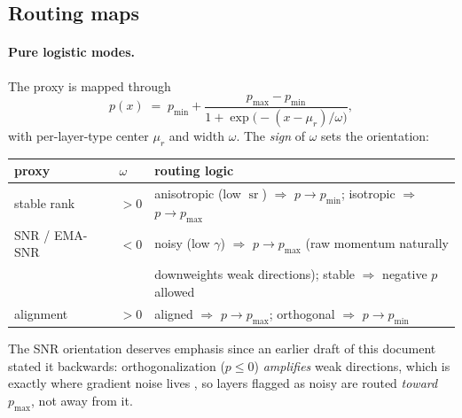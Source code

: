 \documentclass{article}
\DeclareMathOperator*{\srank}{sr}
\begin{document}
\subsection{Routing maps}

\paragraph{Pure logistic modes.} The proxy is mapped through
\begin{equation}
\label{eq:logistic}
p(x) \;=\; p_{\min} + \frac{p_{\max}-p_{\min}}
{1+\exp\!\bigl(-(x-\mu_r)/\omega\bigr)},
\end{equation}
with per-layer-type center $\mu_r$ and width $\omega$. The \emph{sign} of
$\omega$ sets the orientation:
\begin{center}
\begin{tabular}{lll}
\toprule
proxy & $\omega$ & routing logic \\
\midrule
stable rank & $>0$ & anisotropic (low $\srank$) $\Rightarrow$ $p \to p_{\min}$;
isotropic $\Rightarrow$ $p \to p_{\max}$\\
SNR / EMA-SNR & $<0$ & noisy (low $\gamma$) $\Rightarrow$ $p \to p_{\max}$
(raw momentum naturally\\
& & downweights weak directions); stable $\Rightarrow$ negative $p$ allowed\\
alignment & $>0$ & aligned $\Rightarrow$ $p \to p_{\max}$;
orthogonal $\Rightarrow$ $p \to p_{\min}$\\
\bottomrule
\end{tabular}
\end{center}
The SNR orientation deserves emphasis since an earlier draft of this document
stated it backwards: orthogonalization ($p \le 0$) \emph{amplifies} weak
directions, which is exactly where gradient noise lives
\cite{spectral2026noise}, so layers flagged as noisy are routed \emph{toward}
$p_{\max}$, not away from it.
\end{document}
